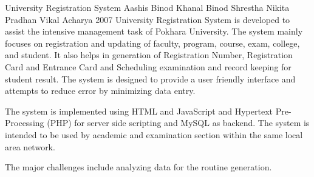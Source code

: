  \begin{conf-abstract}[]
{University Registration System }
{
Aashis Binod Khanal
Binod Shrestha
Nikita Pradhan
Vikal Acharya
}
{2007}
University Registration System is developed  to assist the intensive  management task of Pokhara University. The system mainly focuses on registration and updating of faculty, program, course, exam, college, and student. It also helps in generation of Registration Number, Registration Card and Entrance Card and Scheduling examination and record keeping for student result. The system is designed to provide a user friendly interface and attempts to reduce error by minimizing data entry.

The system is implemented using HTML and JavaScript and Hypertext Pre-Processing (PHP) for server side scripting and MySQL as backend. The system is intended to be used by academic and examination section within the same local area network.

The major challenges include analyzing data for the routine generation.
  \end{conf-abstract}